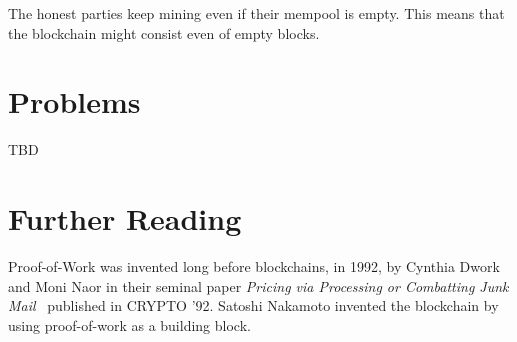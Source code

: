 The honest parties keep mining even if their mempool is empty. This means that the blockchain
might consist even of empty blocks.

\section{Problems}
TBD

\section{Further Reading}

Proof-of-Work was invented long before blockchains, in 1992, by Cynthia Dwork and Moni Naor
in their seminal paper \emph{Pricing via Processing or Combatting Junk Mail}~\cite{pow} published
in CRYPTO '92. Satoshi Nakamoto invented the blockchain by using proof-of-work as a building block.

